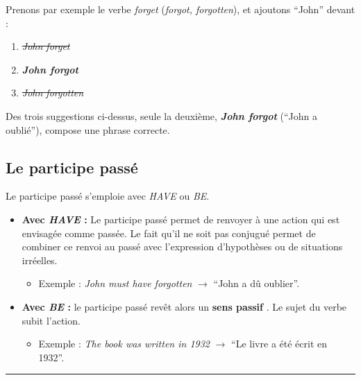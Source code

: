 \documentclass[
  10pt,
]{article}
\providecommand{\tightlist}{%
  \setlength{\itemsep}{0pt}\setlength{\parskip}{0pt}}
\begin{document}
Prenons par exemple le verbe \emph{forget} (\emph{forgot, forgotten}), et ajoutons ``John'' devant :

\begin{enumerate}
\def\labelenumi{\arabic{enumi}.}
\tightlist
\item
  \sout{\color[HTML]{f44336}\emph{John forget} \color{black}}
\item
  \textbf{\color[HTML]{4caf50}\emph{John forgot} \color{black}}
\item
  \sout{\color[HTML]{f44336}\emph{John forgotten} \color{black}}
\end{enumerate}

Des trois suggestions ci-dessus, seule la deuxième, \textbf{\color[HTML]{4caf50}\emph{John forgot} \color{black}} (``John a oublié''), compose une phrase correcte.

\hypertarget{le-participe-passuxe9}{%
\subsection{Le participe passé}\label{le-participe-passuxe9}}

Le participe passé s'emploie avec \emph{HAVE} ou \emph{BE}.

\begin{itemize}
\tightlist
\item
  \textbf{Avec \emph{HAVE} :} Le participe passé permet de renvoyer à une action qui est envisagée comme passée.
  Le fait qu'il ne soit pas conjugué permet de combiner ce renvoi au passé avec l'expression d'hypothèses ou de situations irréelles.

  \begin{itemize}
  \tightlist
  \item
    Exemple : \emph{John must have forgotten} \(\rightarrow\) ``John a dû oublier''.
  \end{itemize}
\item
  \textbf{Avec \emph{BE} :} le participe passé revêt alors un \textbf{\color[HTML]{f44336}sens passif \color{black}}. Le sujet du verbe subit l'action.

  \begin{itemize}
  \tightlist
  \item
    Exemple : \emph{The book was written in 1932} \(\rightarrow\) ``Le livre a été écrit en 1932''.
  \end{itemize}
\end{itemize}

\begin{center}\rule{0.5\linewidth}{0.5pt}\end{center}
\end{document}
